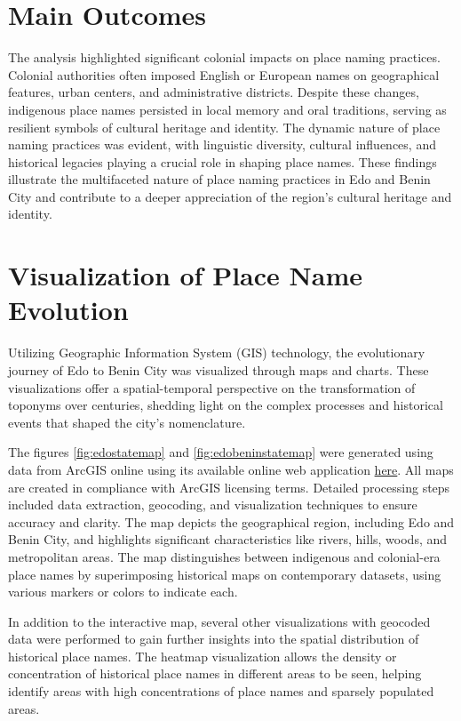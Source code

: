 \section{Main Outcomes}

The analysis highlighted significant colonial impacts on place naming practices. Colonial authorities often imposed English or European names on geographical features, urban centers, and administrative districts. Despite these changes, indigenous place names persisted in local memory and oral traditions, serving as resilient symbols of cultural heritage and identity. The dynamic nature of place naming practices was evident, with linguistic diversity, cultural influences, and historical legacies playing a crucial role in shaping place names. These findings illustrate the multifaceted nature of place naming practices in Edo and Benin City and contribute to a deeper appreciation of the region's cultural heritage and identity.

\section{Visualization of Place Name Evolution}

Utilizing Geographic Information System (GIS) technology, the evolutionary journey of Edo to Benin City was visualized through maps and charts. These visualizations offer a spatial-temporal perspective on the transformation of toponyms over centuries, shedding light on the complex processes and historical events that shaped the city's nomenclature.

The figures \ref{fig:edostatemap} and \ref{fig:edobeninstatemap} were generated using data from ArcGIS online using its available online web application \href{https://www.arcgis.com/apps/mapviewer/index.html}{here}. All maps are created in compliance with ArcGIS licensing terms. Detailed processing steps included data extraction, geocoding, and visualization techniques to ensure accuracy and clarity. The map depicts the geographical region, including Edo and Benin City, and highlights significant characteristics like rivers, hills, woods, and metropolitan areas. The map distinguishes between indigenous and colonial-era place names by superimposing historical maps on contemporary datasets, using various markers or colors to indicate each.

In addition to the interactive map, several other visualizations with geocoded data were performed to gain further insights into the spatial distribution of historical place names. The heatmap visualization allows the density or concentration of historical place names in different areas to be seen, helping identify areas with high concentrations of place names and sparsely populated areas.

